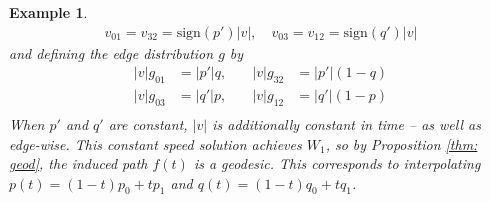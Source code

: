 \documentclass[conference]{IEEEtran}
\theoremstyle{ieeestyle}
\newtheorem{exam}{Example}
\begin{document}
\begin{exam}
\begin{align*}
    v_{01} = v_{32} = \text{sign}(p')|v|, \quad v_{03} = v_{12} = \text{sign}(q')|v|
\end{align*}
and defining the edge distribution $g$ by
\begin{align*}
 |v|g_{01} &= |p'|q, &\quad |v|g_{32} &= |p'|(1-q)\\
    |v|g_{03} &= |q'|p, &\quad |v|g_{12} &= |q'|(1-p) \\
\end{align*}
When $p'$ and $q'$ are constant, $|v|$ is additionally constant in time -- as well as edge-wise. This constant speed solution achieves $W_1$, so by Proposition \ref{thm: geod}, the induced path $f(t)$ is a geodesic. This corresponds to interpolating $p(t) = (1-t)p_0 + tp_1$ and $q(t) = (1-t)q_0 + tq_1$.
\end{exam}
\newpage 

\end{document}
